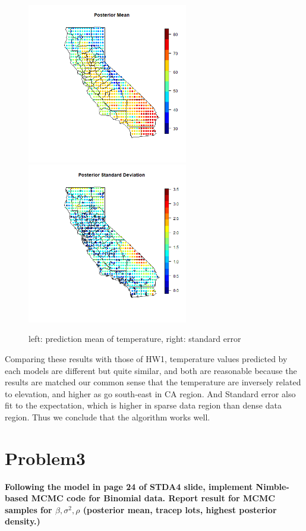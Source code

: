 \documentclass{article}
\begin{document}
\begin{figure}[!h]
    \centering
    \includegraphics[height=7cm]{prob2_posterior.png}
    \includegraphics[height=7cm]{prob2_posterior_SE.png}
    \caption{left: prediction mean of temperature, right: standard error}
\end{figure}

Comparing these results with those of HW1, temperature values predicted by each models
are different but quite similar, and both are reasonable because the results are matched 
our common sense that the temperature are inversely related to elevation, 
and higher as go south-east in CA region.
And Standard error also fit to the expectation, which is higher in sparse data region than
dense data region.
Thus we conclude that the algorithm works well.


\section{Problem3}
\textbf{
Following the model in page 24 of STDA4 slide, 
implement Nimble-based MCMC code for Binomial data.
Report result for MCMC samples for $\beta,\sigma^2,\rho$ (posterior mean, tracep lots, highest posterior density.)
}
\end{document}
